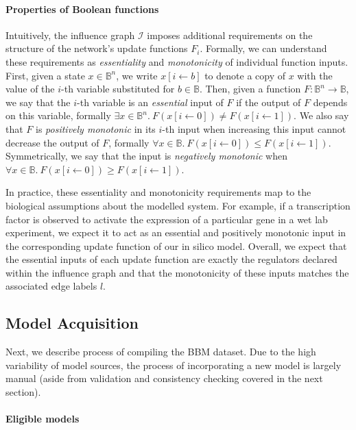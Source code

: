 \documentclass[fleqn,10pt]{wlscirep}
\begin{document}
\paragraph{Properties of Boolean functions} Intuitively, the influence graph $\mathcal{I}$ imposes additional requirements on the structure of the network's update functions $F_i$. Formally, we can understand these requirements as \emph{essentiality} and \emph{monotonicity} of individual function inputs. First, given a state $x \in \mathbb{B}^n$, we write $x[i \gets b]$ to denote a copy of $x$ with the value of the $i$-th variable substituted for $b \in \mathbb{B}$. Then, given a function $F: \mathbb{B}^n \to \mathbb{B}$, we say that the $i$-th variable is an \emph{essential} input of $F$ if the output of $F$ depends on this variable, formally $\exists x \in \mathbb{B}^n.~F(x[i \gets 0]) \not= F(x[i \gets 1])$. We also say that $F$ is \emph{positively monotonic} in its $i$-th input when increasing this input cannot decrease the output of $F$, formally $\forall x \in \mathbb{B}.~F(x[i \gets 0]) \leq F(x[i \gets 1])$. Symmetrically, we say that the input is \emph{negatively monotonic} when $\forall x \in \mathbb{B}.~F(x[i \gets 0]) \geq F(x[i \gets 1])$.

In practice, these essentiality and monotonicity requirements map to the biological assumptions about the modelled system. For example, if a transcription factor is observed to activate the expression of a particular gene in a wet lab experiment, we expect it to act as an essential and positively monotonic input in the corresponding update function of our in silico model. Overall, we expect that the essential inputs of each update function are exactly the regulators declared within the influence graph and that the monotonicity of these inputs matches the associated edge labels $l$.

\subsection*{Model Acquisition}

Next, we describe process of compiling the BBM dataset. Due to the high variability of model sources, the process of incorporating a new model is largely manual (aside from validation and consistency checking covered in the next section).

\paragraph{Eligible models} 
\end{document}

